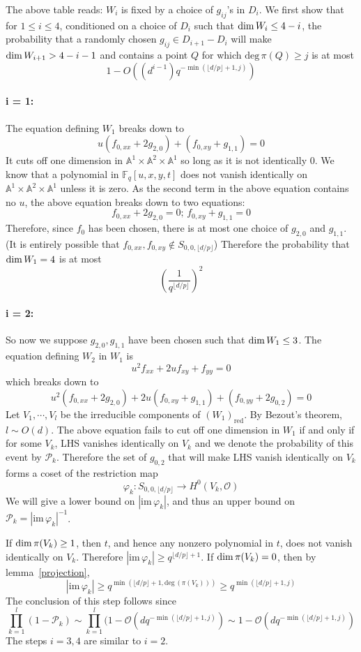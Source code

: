\documentclass[12pt]{article}
\theoremstyle{plain}
\theoremstyle{definition}
\newcommand{\sP}{\mathcal{P}}
\newcommand{\IA}{\mathbb{A}}
\newcommand{\IF}{\mathbb{F}}
\newcommand{\sO}{\mathcal{O}}
\renewcommand{\deg}{\mathrm{deg}\,}
\renewcommand\dim{{\rm dim\,}}
\newcommand{\<}{\langle}
\renewcommand{\>}{\rangle}
\newcommand{\fl}[1]{\lfloor #1 \rfloor}
\newcommand{\im}{\mathrm{im}\,}
\begin{document}
The above table reads: $W_i$ is fixed by a choice of $g_{ij}$'s in $D_i$. We first show that for $1 \le i \le 4$, conditioned on a choice of $D_i$ such that $\dim W_i \le 4 - i$, the probability that a randomly chosen $g_{ij} \in D_{i + 1} - D_i$ will make $\dim W_{i + 1} > 4 - i - 1$ and contains a point $Q$ for which $\deg \pi(Q) \ge j$ is at most
$$ 1 - O((d^{i-1}) q^{-\min(\fl{d/p} + 1, j)}) $$


\paragraph{i = 1:} The equation defining $W_1$ breaks down to 
$$ u(f_{0, xx} + 2g_{2, 0}) + (f_{0, xy} + g_{1, 1}) = 0$$ 
It cuts off one dimension in $\IA^1 \times \IA^2 \times \IA^1$ so long as it is not identically $0$. We know that a polynomial in $\IF_q[u, x, y, t]$ does not vanish identically on $\IA^1 \times \IA^2 \times \IA^1$ unless it is zero. As the second term in the above equation contains no $u$, the above equation breaks down to two equations:
$$ f_{0, xx} + 2g_{2, 0} = 0; \, f_{0, xy} + g_{1, 1} = 0$$
Therefore, since $f_0$ has been chosen, there is at most one choice of $g_{2, 0}$ and $g_{1, 1}$. (It is entirely possible that $f_{0, xx}, f_{0, xy} \not\in S_{0, 0, \fl{d/p}}$) Therefore the probability that $\dim W_1 = 4$ is at most
$$ (\frac{1}{q^{\fl{d/p}}})^2$$
\paragraph{i = 2:} 
So now we suppose $g_{2,0}, g_{1,1}$ have been chosen such that $\dim W_1 \le 3$. The equation defining $W_2$ in $W_1$ is 
$$ u^2 f_{xx} + 2u f_{xy} + f_{yy} = 0 $$
which breaks down to 
$$ u^2(f_{0, xx} + 2 g_{2, 0}) + 2u(f_{0, xy} + g_{1, 1}) + (f_{0, yy} + 2 g_{0, 2}) = 0 $$
Let $V_1, \cdots, V_l$ be the irreducible components of $(W_1)_{\mathrm{red}}$. By Bezout's theorem, $l \sim O(d)$. The above equation fails to cut off one dimension in $W_1$ if and only if for some $V_k$, LHS vanishes identically on $V_k$ and we denote the probability of this event by $\sP_k$. Therefore the set of $g_{0, 2}$ that will make LHS vanish identically on $V_k$ forms a coset of the restriction map 
$$ \varphi_k : S_{0, 0, \fl{d/p}} \to H^0(V_k, \sO) $$
We will give a lower bound on $|\im \varphi_k|$, and thus an upper bound on $\sP_k = |\im \varphi_k|^{-1}$. 

If $\dim \pi(V_k) \ge 1$, then $t$, and hence any nonzero polynomial in $t$, does not vanish identically on $V_k$. Therefore $|\im \varphi_k| \ge q^{\fl{d/p} + 1}$. If $\dim \pi(V_k) = 0$, then by lemma~\ref{projection}, 
$$ |\im \varphi_k| \ge q^{\min(\fl{d/p} + 1, \deg(\pi(V_k)))} \ge q^{\min(\fl{d/p} + 1, j)} $$
The conclusion of this step follows since 
$$ \prod_{k = 1}^l (1 - \sP_k)  \sim \prod_{k = 1}^l (1 - \sO(d q^{-\min(\fl{d/p} + 1, j)}) \sim 1 - \sO(d q^{-\min(\fl{d/p} + 1, j)})$$
The steps $i = 3, 4$ are similar to $i = 2$. 
\end{document}
